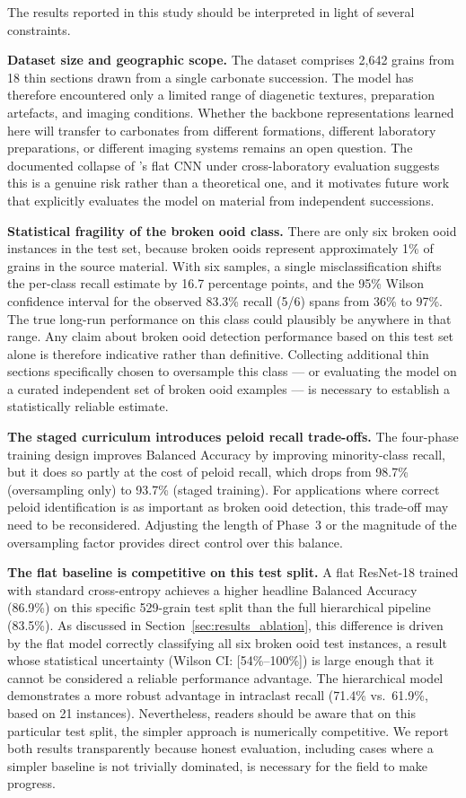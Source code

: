 \documentclass[a4paper,fleqn]{cas-dc}
\begin{document}
The results reported in this study should be interpreted in light of several constraints.

\textbf{Dataset size and geographic scope.} The dataset comprises 2,642 grains from 18 thin sections drawn from a single carbonate succession. The model has therefore encountered only a limited range of diagenetic textures, preparation artefacts, and imaging conditions. Whether the backbone representations learned here will transfer to carbonates from different formations, different laboratory preparations, or different imaging systems remains an open question. The documented collapse of \citet{pireslima2020}'s flat CNN under cross-laboratory evaluation suggests this is a genuine risk rather than a theoretical one, and it motivates future work that explicitly evaluates the model on material from independent successions.

\textbf{Statistical fragility of the broken ooid class.} There are only six broken ooid instances in the test set, because broken ooids represent approximately 1\% of grains in the source material. With six samples, a single misclassification shifts the per-class recall estimate by 16.7 percentage points, and the 95\% Wilson confidence interval for the observed 83.3\% recall (5/6) spans from 36\% to 97\%. The true long-run performance on this class could plausibly be anywhere in that range. Any claim about broken ooid detection performance based on this test set alone is therefore indicative rather than definitive. Collecting additional thin sections specifically chosen to oversample this class --- or evaluating the model on a curated independent set of broken ooid examples --- is necessary to establish a statistically reliable estimate.

\textbf{The staged curriculum introduces peloid recall trade-offs.} The four-phase training design improves Balanced Accuracy by improving minority-class recall, but it does so partly at the cost of peloid recall, which drops from 98.7\% (oversampling only) to 93.7\% (staged training). For applications where correct peloid identification is as important as broken ooid detection, this trade-off may need to be reconsidered. Adjusting the length of Phase~3 or the magnitude of the oversampling factor provides direct control over this balance.

\textbf{The flat baseline is competitive on this test split.} A flat ResNet-18 trained with standard cross-entropy achieves a higher headline Balanced Accuracy (86.9\%) on this specific 529-grain test split than the full hierarchical pipeline (83.5\%). As discussed in Section~\ref{sec:results_ablation}, this difference is driven by the flat model correctly classifying all six broken ooid test instances, a result whose statistical uncertainty (Wilson CI: [54\%--100\%]) is large enough that it cannot be considered a reliable performance advantage. The hierarchical model demonstrates a more robust advantage in intraclast recall (71.4\% vs.\ 61.9\%, based on 21 instances). Nevertheless, readers should be aware that on this particular test split, the simpler approach is numerically competitive. We report both results transparently because honest evaluation, including cases where a simpler baseline is not trivially dominated, is necessary for the field to make progress.
\end{document}
